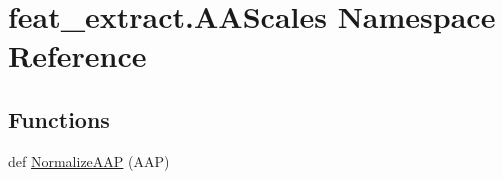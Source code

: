 \hypertarget{namespacefeat__extract_1_1_a_a_scales}{}\section{feat\+\_\+extract.\+A\+A\+Scales Namespace Reference}
\label{namespacefeat__extract_1_1_a_a_scales}
\subsection*{Functions}
\begin{DoxyCompactItemize}
\item 
def \hyperlink{namespacefeat__extract_1_1_a_a_scales_a2ae32c594dc8982017080a7934d0be22}{Normalize\+A\+A\+P} (A\+A\+P)
\end{DoxyCompactItemize}
